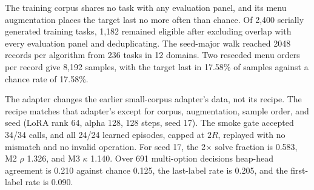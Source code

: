The training corpus shares no task with any evaluation panel, and its menu augmentation places the target last no more often than chance. Of 2,400 serially generated training tasks, 1,182 remained eligible after excluding overlap with every evaluation panel and deduplicating. The seed-major walk reached 2048 records per algorithm from 236 tasks in 12 domains. Two reseeded menu orders per record give 8,192 samples, with the target last in 17.58\% of samples against a chance rate of 17.58\%.

The adapter changes the earlier small-corpus adapter's data, not its recipe. The recipe matches that adapter's except for corpus, augmentation, sample order, and seed (LoRA rank 64, alpha 128, 128 steps, seed 17). The smoke gate accepted 34/34 calls, and all 24/24 learned episodes, capped at $2R$, replayed with no mismatch and no invalid operation. For seed 17, the 2$\times$ solve fraction is 0.583, M2 $\rho$ 1.326, and M3 $\kappa$ 1.140. Over 691 multi-option decisions heap-head agreement is 0.210 against chance 0.125, the last-label rate is 0.205, and the first-label rate is 0.090.

